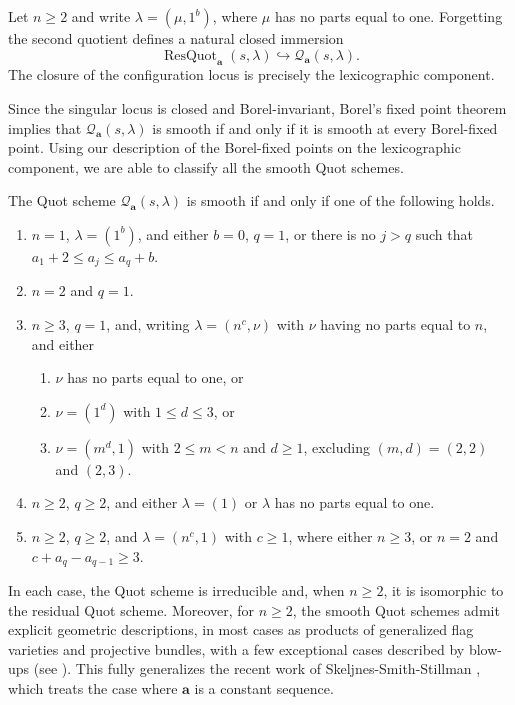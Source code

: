 \documentclass[leqno,11pt,a4paper]{amsart}
\newenvironment{customthm}[1]
  {\renewcommand\theinnercustomthm{#1}\innercustomthm}
  {\endinnercustomthm}
\theoremstyle{definition}
\numberwithin{equation}{section}
\newcommand{\bfa}{\mathbf{a}}
\newcommand{\QQ}{\mathcal{Q}}
\DeclareMathOperator{\ResQuot}{ResQuot}
\begin{document}
\begin{customthm}{D}
Let $n\geq2$ and write $\lambda=(\mu,1^b)$, where $\mu$ has no parts equal to one. 
Forgetting the second quotient defines a natural closed immersion
$$
\ResQuot_{\bfa}(s,\lambda) \hookrightarrow \QQ_{\bfa}(s,\lambda).
$$
The closure of the configuration locus is precisely the lexicographic component.
\end{customthm}


Since the singular locus is closed and Borel-invariant, Borel's fixed point theorem implies that $\QQ_{\bfa}(s,\lambda)$ is smooth if and only if it is smooth at every Borel-fixed point.
Using our description of the Borel-fixed points on the lexicographic component, we are able to classify all the smooth Quot schemes.

\begin{customthm}{E}
The Quot scheme $\QQ_{\bfa}(s,\lambda)$ is smooth if and only if one of the following holds.
\begin{enumerate}
\item $n=1$, $\lambda=(1^b)$, and either $b=0$, $q=1$, or there is no $j>q$ such that $a_1+2\leq a_j\leq a_q+b$.
\item $n=2$ and $q=1$.
\item $n\geq3$, $q=1$, and, writing $\lambda=(n^c,\nu)$ with $\nu$ having no parts equal to $n$, and either
\begin{enumerate}
\item[(a)] $\nu$ has no parts equal to one, or
\item[(b)] $\nu=(1^d)$ with $1\leq d\leq3$, or
\item[(c)] $\nu=(m^d,1)$ with $2\leq m<n$ and $d\geq1$, excluding $(m,d)=(2,2)$ and $(2,3)$.
\end{enumerate}
\item $n\geq2$, $q\geq2$, and either $\lambda= (1)$ or $\lambda$ has no parts equal to one.
\item $n\geq2$, $q\geq2$, and $\lambda=(n^c,1)$ with $c\geq1$,
where either $n\geq3$, or $n=2$ and $c+a_q-a_{q-1}\geq3$.
\end{enumerate}
\end{customthm}
In each case, the Quot scheme is irreducible and, when $n\geq 2$, it is isomorphic to the residual Quot scheme. 
Moreover, for $n\geq2$, the smooth Quot schemes admit explicit geometric descriptions, in most cases as products of generalized flag varieties and projective bundles, with a few exceptional cases described by blow-ups (see ). 
This fully generalizes the recent work of Skeljnes-Smith-Stillman \cite{SSS26}, which treats the case where $\bfa$ is a constant sequence.
\end{document}
